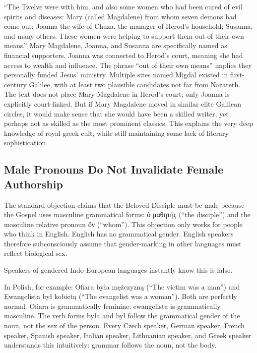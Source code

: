 ``The Twelve were with him, and also some women who had been cured of evil spirits and diseases: Mary (called Magdalene) from whom seven demons had come out; Joanna the wife of Chuza, the manager of Herod's household; Susanna; and many others.
These women were helping to support them out of their own means.'' Mary Magdalene, Joanna, and Susanna are specifically named as financial supporters.
Joanna was connected to Herod's court, meaning she had access to wealth and influence.
The phrase ``out of their own means'' implies they personally funded Jesus' ministry.
Multiple sites named Migdal existed in first-century Galilee, with at least two plausible candidates not far from Nazareth.
The text does not place Mary Magdalene in Herod's court; only Joanna is explicitly court-linked.
But if Mary Magdalene moved in similar elite Galilean circles, it would make sense that she would have been a skilled writer, yet perhaps not as skilled as the most prominent classics.
This explains the very deep knowledge of royal greek cult, while still maintaining some lack of literary sophistication.

\subsection{Male Pronouns Do Not Invalidate Female Authorship}\label{subsec:the-authorship-of-mary-is-typically-dismissed-as-a-possibility-because-of-the-use-of-male-pronouns-in-the-gospel.}

The standard objection claims that the Beloved Disciple must be male because the Gospel uses masculine grammatical forms: ὁ μαθητής (``the disciple'') and the masculine relative pronoun ὃν (``whom'').
This objection only works for people who think in English.
English has no grammatical gender.
English speakers therefore subconsciously assume that gender-marking in other languages must reflect biological sex.

Speakers of gendered Indo-European languages instantly know this is false.

In Polish, for example: Ofiara była mężczyzną (``The victim was a man'') and Ewangelista był kobietą (``The evangelist was a woman'').
Both are perfectly normal.
Ofiara is grammatically feminine; ewangelista is grammatically masculine.
The verb forms była and był follow the grammatical gender of the noun, not the sex of the person.
Every Czech speaker, German speaker, French speaker, Spanish speaker, Italian speaker, Lithuanian speaker, and Greek speaker understands this intuitively: grammar follows the noun, not the body.

